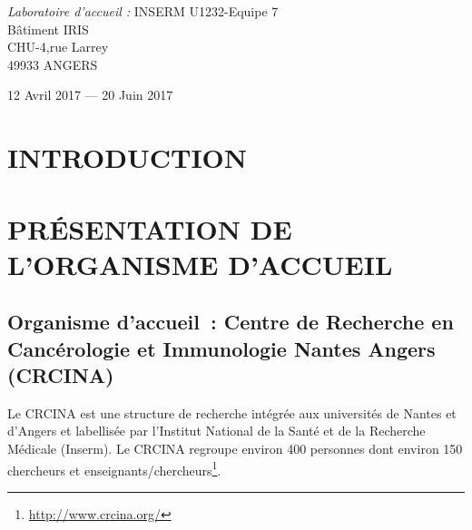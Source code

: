 \documentclass[a4paper,10pt]{article}
\newcommand\tabA[1][0.5cm]{\hspace*{#1}}
\newcommand\tabC[1][2cm]{\hspace*{#1}}
\begin{document}
\begin{titlepage}
\begin{sffamily}
\begin{center}
\begin{minipage}{9\textwidth}
\begin{doublespace}
\begin{tabular}{cl}
    \end{tabular}
     \end{doublespace}
    \emph{Laboratoire d'accueil :} \tabC \tabA \textsc{INSERM U1232}-Equipe 7
    \\\tabC \tabC \tabC \tabA Bâtiment IRIS 
    \\\tabC \tabC \tabC \tabA CHU-4,rue Larrey 
    \\\tabC \tabC \tabC \tabA 49933 ANGERS
    \end{minipage}
    \vspace*{\fill}
%  

    {\large 12 Avril 2017 — 20 Juin 2017}

  \end{center}
  \end{sffamily}
\end{titlepage}
\newpage
\tableofcontents
\newpage
\listoffigures
\newpage
\listoftables
\newpage
\section{INTRODUCTION }

\section{PR\'{E}SENTATION DE L'ORGANISME D'ACCUEIL }
\subsection{Organisme d’accueil : Centre de Recherche en Cancérologie et Immunologie Nantes Angers (CRCINA)}
Le CRCINA est une structure de recherche intégrée aux universités de Nantes et d’Angers et labellisée par l’Institut National de la Santé et de la Recherche Médicale (Inserm). 
Le CRCINA regroupe environ 400 personnes dont environ 150 chercheurs et enseignants/chercheurs\footnote{\url{http://www.crcina.org/}}.
\end{document}
